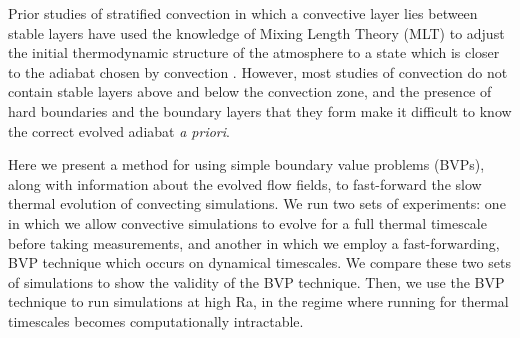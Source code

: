 \documentclass[aps, pre, onecolumn, nofootinbib, notitlepage, groupedaddress, amsfonts, amssymb, amsmath, longbibliography]{revtex4-1}
\begin{document}
Prior studies of stratified convection in which a convective layer lies between stable layers
have used the knowledge of Mixing Length Theory (MLT) to adjust the initial thermodynamic structure of
the atmosphere to a state which is closer to the adiabat chosen by convection \cite{brandenburg&all2005}.
However, most studies of convection do not contain stable layers above and below the convection
zone, and the presence of hard boundaries and the boundary layers that they form make it difficult to
know the correct evolved adiabat \emph{a priori}.

Here we present a method for using simple boundary value problems (BVPs), 
along with information about the evolved flow fields,
to fast-forward the slow thermal evolution of convecting simulations.  
We run two sets of experiments: one in which we allow convective simulations to evolve for a
full thermal timescale before taking measurements, and another in which we employ a fast-forwarding,
BVP technique which occurs on dynamical timescales. We compare these two sets of simulations to
show the validity of the BVP technique.  Then, we use the BVP technique to run simulations
at high Ra, in the regime where running for thermal timescales becomes computationally intractable.
\end{document}
